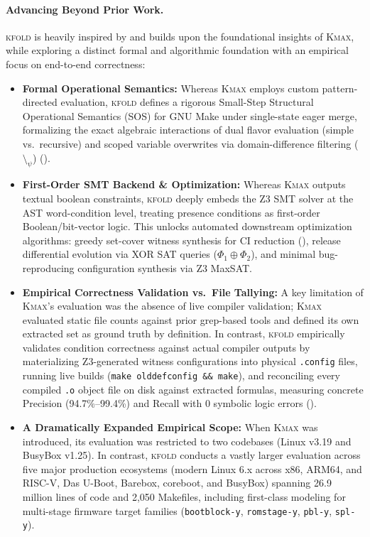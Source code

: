 \documentclass[acmsmall,screen,review]{acmart}
\newcommand{\tool}{\textsc{kfold}\xspace}
\begin{document}
\paragraph{Advancing Beyond Prior Work.}
\tool is heavily inspired by and builds upon the foundational insights of \textsc{Kmax}, while exploring a distinct formal and algorithmic foundation with an empirical focus on end-to-end correctness:
\begin{itemize}
\item \textbf{Formal Operational Semantics:} Whereas \textsc{Kmax} employs custom pattern-directed evaluation, \tool defines a rigorous Small-Step Structural Operational Semantics (SOS) for GNU Make under single-state eager merge, formalizing the exact algebraic interactions of dual flavor evaluation (simple vs.\ recursive) and scoped variable overwrites via domain-difference filtering ($\setminus_\psi$) ().
\item \textbf{First-Order SMT Backend \& Optimization:} Whereas \textsc{Kmax} outputs textual boolean constraints, \tool deeply embeds the Z3 SMT solver at the AST word-condition level, treating presence conditions as first-order Boolean/bit-vector logic. This unlocks automated downstream optimization algorithms: greedy set-cover witness synthesis for CI reduction (), release differential evolution via XOR SAT queries ($\Phi_1 \oplus \Phi_2$), and minimal bug-reproducing configuration synthesis via Z3 MaxSAT.
\item \textbf{Empirical Correctness Validation vs.\ File Tallying:} A key limitation of \textsc{Kmax}'s evaluation was the absence of live compiler validation; \textsc{Kmax} evaluated static file counts against prior grep-based tools and defined its own extracted set as ground truth by definition. In contrast, \tool empirically validates condition correctness against actual compiler outputs by materializing Z3-generated witness configurations into physical \texttt{.config} files, running live builds (\texttt{make olddefconfig \&\& make}), and reconciling every compiled \texttt{.o} object file on disk against extracted formulas, measuring concrete Precision (94.7\%--99.4\%) and Recall with 0 symbolic logic errors ().
\item \textbf{A Dramatically Expanded Empirical Scope:} When \textsc{Kmax} was introduced, its evaluation was restricted to two codebases (Linux v3.19 and BusyBox v1.25). In contrast, \tool conducts a vastly larger evaluation across five major production ecosystems (modern Linux 6.x across x86, ARM64, and RISC-V, Das U-Boot, Barebox, coreboot, and BusyBox) spanning 26.9 million lines of code and 2,050 Makefiles, including first-class modeling for multi-stage firmware target families (\texttt{bootblock-y}, \texttt{romstage-y}, \texttt{pbl-y}, \texttt{spl-y}).
\end{itemize}
\end{document}
